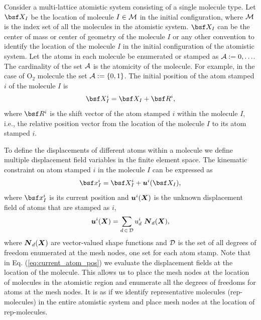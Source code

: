 \documentclass[a4paper,10pt]{article}
\newcommand{\refeq}[1]{Eq. (\ref{eq:#1})}
\def\gz  #1{           \mbox{\boldmath $\mit #1$}}
\def\mcl  #1{               {\cal #1}}
\begin{document}
Consider a multi-lattice atomistic system consisting of a single molecule type.
Let $\bsf X_I$ be the location of molecule $I \in \mcl M$ in the initial 
configuration, where $\mcl M$ is the index set of all the molecules in the 
atomistic system. $\bsf X_I$ can be the center of mass or center of geometry of 
the molecule $I$ or any other convention to identify the location of 
the molecule $I$ in the initial configuration of the atomistic system. Let the 
atoms in each molecule be enumerated or stamped as $\mcl A := {0, \ldots}$. The
cardinality of the set $\mcl A$ is the atomicity of the molecule.
For example, in the case of O$_2$ molecule the set $\mcl A := \left\lbrace 0,1 
\right\rbrace$. The initial position of the atom stamped $i$ of the molecule 
$I$ is
\begin{align}
 \bsf X_I ^i = \bsf X_I + \bsf R^i,
\end{align}
where $\bsf R^i$ is the shift vector of the atom stamped $i$ within the 
molecule $I$, i.e., the relative position vector from the location of the 
molecule $I$ to its atom stamped $i$.

To define the displacements of different atoms within a molecule we define
multiple displacement field variables in the finite element space. The 
kinematic constraint on atom stamped $i$ in the molecule $I$ can be 
expressed as
\begin{align}
 \bsf x_I^i = \bsf X_I^i + \gz u^i(\bsf X_I),
 \label{eq:current_atom_pos}
\end{align}
where $\bsf x_I^i$ is its current position and $\gz u^i( \gz X)$ is the unknown
displacement field of atoms that are stamped as $i$,
\begin{align}
 \gz u^i (\gz X) = \sum_{d \, \in \, \mcl D} u^i_d \,\, \gz N_d (\gz X),
\end{align}
where $\gz N_d (\gz X)$ are vector-valued shape functions and $\mcl D$ is the 
set of all degrees of freedom enumerated at the mesh nodes, one set for each 
atom stamp.
Note that in \refeq{current_atom_pos} we evaluate the displacement fields at 
the location of the molecule. This allows us to place the mesh nodes at the 
location of molecules in the atomistic region and enumerate all the degrees of 
freedoms for atoms at the mesh nodes. It is as if we identify representative 
molecules (rep-molecules) in the entire atomistic system and place mesh nodes 
at the location of rep-molecules.
\end{document}
